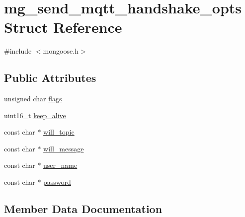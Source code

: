 \hypertarget{structmg__send__mqtt__handshake__opts}{}\section{mg\+\_\+send\+\_\+mqtt\+\_\+handshake\+\_\+opts Struct Reference}
\label{structmg__send__mqtt__handshake__opts}


{\ttfamily \#include $<$mongoose.\+h$>$}

\subsection*{Public Attributes}
\begin{DoxyCompactItemize}
\item 
unsigned char \hyperlink{structmg__send__mqtt__handshake__opts_a89a41409815899bd7ed46a510a162bc8_a89a41409815899bd7ed46a510a162bc8}{flags}
\item 
uint16\+\_\+t \hyperlink{structmg__send__mqtt__handshake__opts_a39a20b37f0de09f81c6de35690f7d98f_a39a20b37f0de09f81c6de35690f7d98f}{keep\+\_\+alive}
\item 
const char $\ast$ \hyperlink{structmg__send__mqtt__handshake__opts_a7cdd8f59da7f39ccd8face3e7267d634_a7cdd8f59da7f39ccd8face3e7267d634}{will\+\_\+topic}
\item 
const char $\ast$ \hyperlink{structmg__send__mqtt__handshake__opts_a747846d48256c35b24544a1e19321f09_a747846d48256c35b24544a1e19321f09}{will\+\_\+message}
\item 
const char $\ast$ \hyperlink{structmg__send__mqtt__handshake__opts_a3110a5a3589f32974b23f442b970ee85_a3110a5a3589f32974b23f442b970ee85}{user\+\_\+name}
\item 
const char $\ast$ \hyperlink{structmg__send__mqtt__handshake__opts_ac16baef17869ac723d502190b19780bf_ac16baef17869ac723d502190b19780bf}{password}
\end{DoxyCompactItemize}


\subsection{Member Data Documentation}
\mbox{\label{structmg__send__mqtt__handshake__opts_a89a41409815899bd7ed46a510a162bc8_a89a41409815899bd7ed46a510a162bc8}} 
